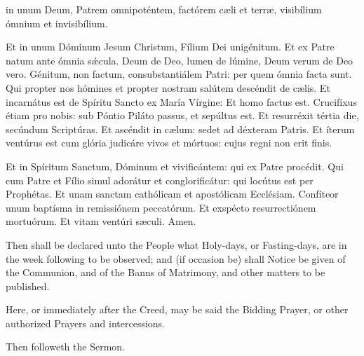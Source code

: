     { in unum Deum, Patrem omnipoténtem, factórem c{\ae}li et terr{\ae}, visibílium ómnium et invisibílium.\par
    Et in unum Dóminum Jesum Christum, Fílium Dei unigénitum. Et ex Patre natum ante ómnia sǽcula. Deum de Deo, lumen de lúmine, Deum verum de Deo vero. Génitum, non factum, consubstantiálem Patri: per quem ómnia facta sunt. Qui propter nos hómines et propter nostram salútem descéndit de c{\ae}lis.  Et incarnátus est de Spíritu Sancto ex María Vírgine: Et homo factus est.  Crucifíxus étiam pro nobis: sub Póntio Piláto passus, et sepúltus est. Et resurréxit tértia die, secúndum Scriptúras. Et ascéndit in c{\ae}lum: sedet ad déxteram Patris. Et íterum ventúrus est cum glória judicáre vivos et mórtuos: cujus regni non erit finis.\par
    Et in Spíritum Sanctum, Dóminum et vivificántem: qui ex Patre procédit. Qui cum Patre et Fílio simul adorátur et conglorificátur: qui locútus est per Prophétas. Et unam sanctam cathólicam et apostólicam Ecclésiam. Confíteor unum baptísma in remissiónem peccatórum. Et exspécto resurrectiónem mortuórum. {} Et vitam ventúri s{\ae}culi. Amen.}
\begin{rubric}
Then shall be declared unto the People what Holy-days, or Fasting-days, are in the week following to be observed; and (if occasion be) shall Notice be given of the Communion, and of the Banns of Matrimony, and other matters to be published.
\end{rubric}

\begin{rubric}
Here, or immediately after the Creed, may be said the Bidding Prayer, or other authorized Prayers and intercessions.
\end{rubric}

\begin{rubric}
	Then followeth the Sermon.
\end{rubric}


